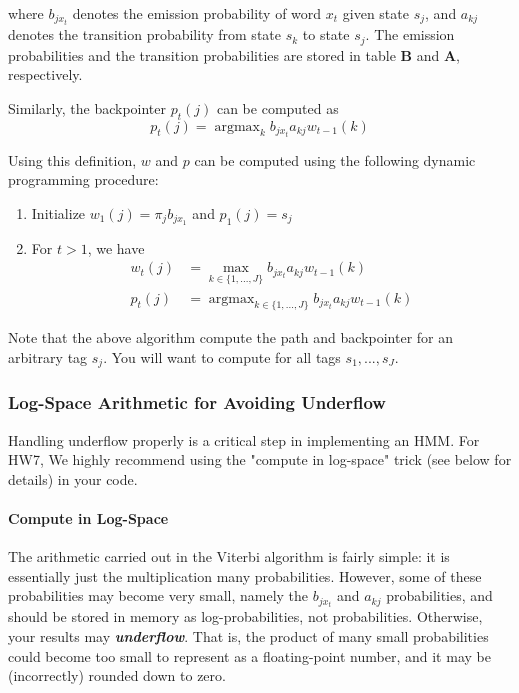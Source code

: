 \documentclass{article}
\newcommand{\argmax}{\mathop{\mathrm{argmax}}}
\begin{document}
where $b_{jx_t}$ denotes the emission probability of word $x_t$ given state $s_j$, and $a_{kj}$ denotes the transition probability from state $s_k$ to state $s_j$. The emission probabilities and the transition probabilities are stored in table $\mathbf{B}$ and $\mathbf{A}$, respectively.

Similarly, the backpointer $p_t(j)$ can be computed as 
$$p_t(j) = \argmax_{k} b_{jx_t} a_{kj} w_{t-1}(k) $$

Using this definition, $w$ and $p$ can be computed using the following dynamic programming procedure: 
\begin{enumerate}
    \item Initialize $w_1(j) = \pi_j b_{jx_1}$ and $p_1(j) = s_j$
    \item For $t > 1$, we have 
    \begin{align*}
        w_t(j) &= \max_{k \in \{1,...,J\}} b_{jx_t} a_{kj} w_{t-1}(k) \\ 
        p_t(j) &= \argmax_{k \in \{1,...,J\}} b_{jx_t} a_{kj} w_{t-1}(k)
    \end{align*}
\end{enumerate}
Note that the above algorithm compute the path and backpointer for an arbitrary tag $s_j$. You will want to compute for all tags $s_1, ..., s_J$.

\subsubsection{Log-Space Arithmetic for Avoiding Underflow}
\label{sec:underflow}

Handling underflow properly is a critical step in implementing an HMM. For HW7, We highly recommend using the "compute in log-space" trick (see below for details) in your code.

\paragraph{Compute in Log-Space} The arithmetic carried out in the Viterbi algorithm is fairly simple: it is essentially just the multiplication many probabilities. However, some of these probabilities may become very small, namely the $b_{jx_t}$ and $a_{kj}$ probabilities, and should be stored in memory as log-probabilities, not probabilities. Otherwise, your results may \textbf{\emph{underflow}}. That is, the product of many small probabilities could become too small to represent as a floating-point number, and it may be (incorrectly) rounded down to zero.
\end{document}
